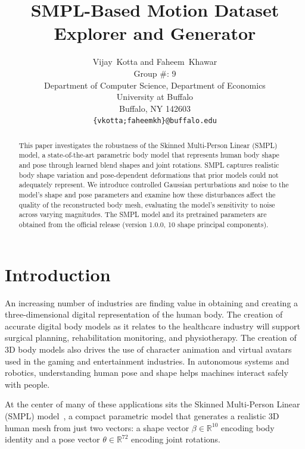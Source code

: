 \documentclass[final]{article}
\title{SMPL-Based Motion Dataset Explorer and Generator}
\author{
  Vijay~Kotta and Faheem~Khawar\\
  Group \#: 9 \\
  Department of Computer Science, Department of Economics\\
  University at Buffalo\\
  Buffalo, NY 142603 \\
  \texttt{\{vkotta;faheemkh\}@buffalo.edu} \\
}
\begin{document}
\maketitle

\begin{abstract}

This paper investigates the robustness of the Skinned Multi-Person Linear (SMPL) model, a state-of-the-art parametric body model that represents human body shape and pose through learned blend shapes and joint rotations. SMPL captures realistic body shape variation and pose-dependent deformations that prior models could not adequately represent. We introduce controlled Gaussian perturbations and noise to the model's shape and pose parameters and examine how these disturbances affect the quality of the reconstructed body mesh, evaluating the model's sensitivity to noise across varying magnitudes. The SMPL model and its pretrained parameters are obtained from the official release (version 1.0.0, 10 shape principal components).

\end{abstract}

{\section{Introduction}}\label{sec:intro}

An increasing number of industries are finding value in obtaining and creating 
a three-dimensional digital representation of the human body. The creation of 
accurate digital body models as it relates to the healthcare industry will 
support surgical planning, rehabilitation monitoring, and physiotherapy. The 
creation of 3D body models also drives the use of character animation and 
virtual avatars used in the gaming and entertainment industries. In autonomous 
systems and robotics, understanding human pose and shape helps machines interact 
safely with people.

At the center of many of these applications sits the Skinned Multi-Person Linear 
(SMPL) model~\cite{SMPL:2015}, a compact parametric model that generates a 
realistic 3D human mesh from just two vectors: a shape vector 
$\beta \in \mathbb{R}^{10}$ encoding body identity and a pose vector 
$\theta \in \mathbb{R}^{72}$ encoding joint rotations.
\end{document}
